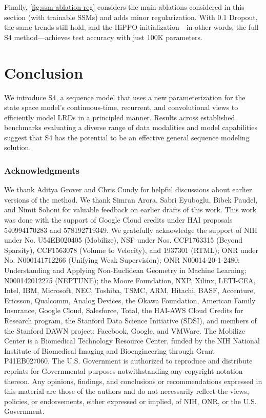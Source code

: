 \documentclass{article}
\newcommand{\methodabbrv}{S4}
\begin{document}
Finally, \cref{fig:ssm-ablation-reg} considers the main ablations considered in this section (with trainable SSMs) and adds minor regularization.
With 0.1 Dropout, the same trends still hold, and the HiPPO initialization---in other words, the full S4 method---achieves  test accuracy with just 100K parameters.
 

\section{Conclusion}
\label{sec:conclusion}

We introduce \methodabbrv, a sequence model that uses a new parameterization for the state space model's continuous-time, recurrent, and convolutional views to efficiently model LRDs in a principled manner.
Results across established benchmarks evaluating a diverse range of data modalities and model capabilities
suggest that \methodabbrv{} has the potential to be an effective general sequence modeling solution.
 

\subsubsection*{Acknowledgments}
We thank Aditya Grover and Chris Cundy for helpful discussions about earlier versions of the method.
We thank Simran Arora, Sabri Eyuboglu, Bibek Paudel, and Nimit Sohoni for valuable feedback on earlier drafts of this work.
This work was done with the support of Google Cloud credits under HAI proposals 540994170283 and 578192719349.
We gratefully acknowledge the support of NIH under No. U54EB020405 (Mobilize), NSF under Nos. CCF1763315 (Beyond Sparsity), CCF1563078 (Volume to Velocity), and 1937301 (RTML); ONR under No. N000141712266 (Unifying Weak Supervision); ONR N00014-20-1-2480: Understanding and Applying Non-Euclidean Geometry in Machine Learning; N000142012275 (NEPTUNE); the Moore Foundation, NXP, Xilinx, LETI-CEA, Intel, IBM, Microsoft, NEC, Toshiba, TSMC, ARM, Hitachi, BASF, Accenture, Ericsson, Qualcomm, Analog Devices, the Okawa Foundation, American Family Insurance, Google Cloud, Salesforce, Total, the HAI-AWS Cloud Credits for Research program, the Stanford Data Science Initiative (SDSI), and members of the Stanford DAWN project: Facebook, Google, and VMWare. The Mobilize Center is a Biomedical Technology Resource Center, funded by the NIH National Institute of Biomedical Imaging and Bioengineering through Grant P41EB027060. The U.S. Government is authorized to reproduce and distribute reprints for Governmental purposes notwithstanding any copyright notation thereon. Any opinions, findings, and conclusions or recommendations expressed in this material are those of the authors and do not necessarily reflect the views, policies, or endorsements, either expressed or implied, of NIH, ONR, or the U.S. Government.
\end{document}
